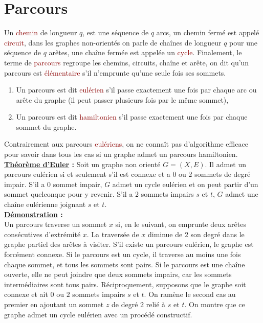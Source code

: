 \documentclass{article}
\newcommand{\red}[1]{\textcolor{darkred}{#1}}
\begin{document}
\section{Parcours}

\noindent Un \red{chemin} de longueur $q$, est une séquence de $q$ arcs, un chemin fermé est appelé \red{circuit}, dans les graphes non-orientés on parle de chaînes de 
longueur $q$ pour une séquence de $q$ arêtes, une chaîne fermée est appelée un \red{cycle}. Finalement, le terme de \red{parcours} regroupe les chemins, circuits, chaîne et 
arête, on dit qu'un parcours est \red{élémentaire} s'il n'emprunte qu'une seule fois ses sommets.
\begin{enumerate}
\item Un parcours est dit \red{eulérien} s'il passe exactement une fois par chaque arc ou arête du graphe (il peut passer plusieurs fois par le même sommet),
\item Un parcours est dit \red{hamiltonien} s'il passe exactement une fois par chaque sommet du graphe.
\end{enumerate}
Contrairement aux parcours \red{eulériens}, on ne connaît pas d'algorithme efficace pour savoir dans tous les cas si un graphe admet un parcours hamiltonien.  \\

\noindent \textbf{\underline{Théorème d'Euler} :} Soit un graphe non orienté $G=(X,E)$. Il admet un parcours eulérien si et seulement s’il est connexe et a $0$ ou $2$ sommets 
de degré impair. S’il a $0$ sommet impair, $G$ admet un cycle eulérien et on peut partir d’un sommet quelconque pour y revenir. S’il a 2 sommets impairs $s$ et $t$, $G$ admet 
une chaîne eulérienne joignant $s$ et $t$. \\

\noindent \textbf{\underline{Démonstration} :} \\
Un parcours traverse un sommet $x$ si, en le suivant, on emprunte deux arêtes consécutives d’extrémité $x$. La traversée de $x$ diminue de 2 son degré dans le graphe partiel 
des arêtes à visiter. S’il existe un parcours eulérien, le graphe est forcément connexe. Si le parcours est un cycle, il traverse au moins une fois chaque sommet, et tous les sommets
sont pairs. Si le parcours est une chaîne ouverte, elle ne peut joindre que deux sommets impairs, car les sommets intermédiaires sont tous pairs. Réciproquement, supposons que le 
graphe soit connexe et ait $0$ ou $2$ sommets impairs $s$ et $t$. On ramène le second cas au premier en ajoutant un sommet $z$ de degré $2$ relié à $s$ et $t$. On montre 
que ce graphe admet un cycle eulérien avec un procédé constructif. 
\end{document}
